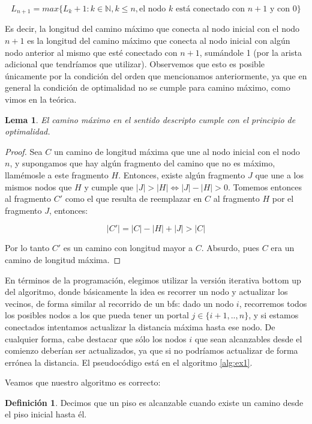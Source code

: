\documentclass{article}
\newtheorem{lemma}{Lema}[theorem]
\theoremstyle{definition}
\newtheorem{definition}{Definición}[section]
\theoremstyle{remark}
\begin{document}
$$L_{n + 1} = max\{L_k + 1 : k \in \mathbb{N}, k \leq n, \text{el nodo } k \text{ está conectado con } n + 1 \text{ y con } 0\}$$

Es decir, la longitud del camino máximo que conecta al nodo inicial con el nodo $n + 1$ es la longitud del camino máximo que conecta al nodo inicial con algún nodo anterior al mismo que esté conectado con $n + 1$, sumándole 1 (por la arista adicional que tendríamos que utilizar). Observemos que esto es posible únicamente por la condición del orden que mencionamos anteriormente, ya que en general la condición de optimalidad no se cumple para camino máximo, como vimos en la teórica.

\begin{lemma}
El camino máximo en el sentido descripto cumple con el principio de optimalidad.
\end{lemma}

\begin{proof}
Sea $C$ un camino de longitud máxima que une al nodo inicial con el nodo $n$, y supongamos que hay algún fragmento del camino que no es máximo, llamémosle a este fragmento $H$. Entonces, existe algún fragmento $J$ que une a los mismos nodos que $H$ y cumple que $|J| > |H| \iff |J| - |H| > 0$. Tomemos entonces al fragmento $C'$ como el que resulta de reemplazar en $C$ al fragmento $H$ por el fragmento $J$, entonces:

$$|C'| = |C| - |H| + |J| > |C|$$

Por lo tanto $C'$ es un camino con longitud mayor a $C$. Absurdo, pues $C$ era un camino de longitud máxima.
\end{proof}

En términos de la programación, elegimos utilizar la versión iterativa bottom up del algoritmo, donde básicamente la idea es recorrer un nodo y actualizar los vecinos, de forma similar al recorrido de un bfs: dado un nodo $i$, recorremos todos los posibles nodos a los que pueda tener un portal $j \in \{i + 1, .., n\}$, y si estamos conectados intentamos actualizar la distancia máxima hasta ese nodo. De cualquier forma, cabe destacar que sólo los nodos $i$ que sean alcanzables desde el comienzo deberían ser actualizados, ya que si no podríamos actualizar de forma errónea la distancia. El pseudocódigo está en el algoritmo \ref{alg:ex1}. %

Veamos que nuestro algoritmo es correcto:

\begin{definition}
Decimos que un piso es alcanzable cuando existe un camino desde el piso inicial hasta él.
\end{definition}
\end{document}
